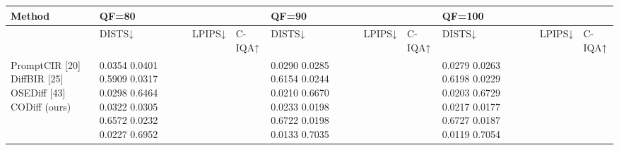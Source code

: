 \begin{tabular}{llllllllll}
\toprule
Method & QF=80 &  &  & QF=90 &  &  & QF=100 &  &  \\
\midrule
 & DISTS↓ & LPIPS↓ & C-IQA↑ & DISTS↓ & LPIPS↓ & C-IQA↑ & DISTS↓ & LPIPS↓ & C-IQA↑ \\
PromptCIR [20] DiffBIR [25] OSEDiff [43] CODiff (ours) & 0.0354 0.0401 0.5909 0.0317 0.0298 0.6464 0.0322 0.0305 0.6572 0.0232 0.0227 0.6952 &  &  & 0.0290 0.0285 0.6154 0.0244 0.0210 0.6670 0.0233 0.0198 0.6722 0.0198 0.0133 0.7035 &  &  & 0.0279 0.0263 0.6198 0.0229 0.0203 0.6729 0.0217 0.0177 0.6727 0.0187 0.0119 0.7054 &  &  \\
\bottomrule
\end{tabular}
